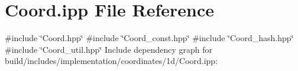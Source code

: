 \hypertarget{build_2includes_2implementation_2coordinates_21d_2Coord_8ipp}{}\section{Coord.\+ipp File Reference}
\label{build_2includes_2implementation_2coordinates_21d_2Coord_8ipp}
{\ttfamily \#include \char`\"{}Coord.\+hpp\char`\"{}}\newline
{\ttfamily \#include \char`\"{}Coord\+\_\+const.\+hpp\char`\"{}}\newline
{\ttfamily \#include \char`\"{}Coord\+\_\+hash.\+hpp\char`\"{}}\newline
{\ttfamily \#include \char`\"{}Coord\+\_\+util.\+hpp\char`\"{}}\newline
Include dependency graph for build/includes/implementation/coordinates/1d/\+Coord.ipp\+:
